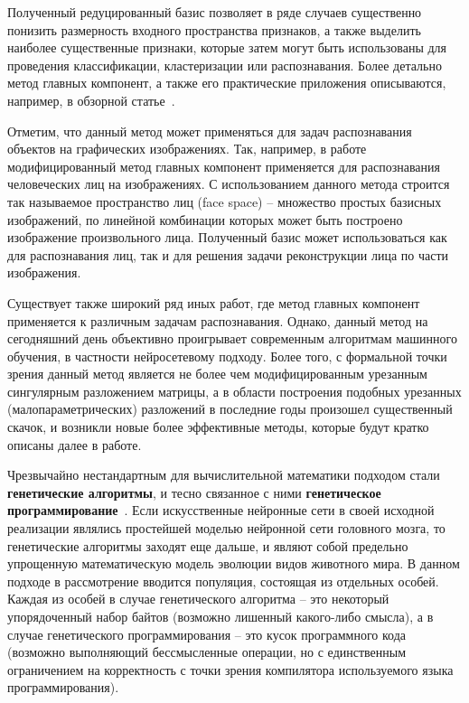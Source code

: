 \documentclass[a4paper,12pt,russian]{article} %
\begin{document}
Полученный редуцированный базис позволяет в ряде случаев существенно понизить размерность входного пространства признаков, а также выделить наиболее существенные признаки, которые затем могут быть использованы для проведения классификации, кластеризации или распознавания.
Более детально метод главных компонент, а также его практические приложения описываются, например, в обзорной статье~\cite{karamizadeh2013overview}.

Отметим, что данный метод может применяться для задач распознавания объектов на графических изображениях.
Так, например, в работе~\cite{deng2014transform} модифицированный метод главных компонент применяется для распознавания человеческих лиц на изображениях.
С использованием данного метода строится так называемое пространство лиц (face space) -- множество простых базисных изображений, по линейной комбинации которых может быть построено изображение произвольного лица.
Полученный базис может использоваться как для распознавания лиц, так и для решения задачи реконструкции лица по части изображения.

Существует также широкий ряд иных работ, где метод главных компонент применяется к различным задачам распознавания.
Однако, данный метод на сегодняшний день объективно проигрывает современным алгоритмам машинного обучения, в частности нейросетевому подходу.
Более того, с формальной точки зрения данный метод является не более чем модифицированным урезанным сингулярным разложением матрицы, а в области построения подобных урезанных (малопараметрических) разложений в последние годы произошел существенный скачок, и возникли новые более эффективные методы, которые будут кратко описаны далее в работе.

Чрезвычайно нестандартным для вычислительной математики подходом стали \textbf{генетические алгоритмы}, и тесно связанное с ними \textbf{генетическое программирование}~\cite{koza1994genetic,banzhaf1998genetic}.
Если искусственные нейронные сети в своей исходной реализации являлись простейшей моделью нейронной сети головного мозга, то генетические алгоритмы заходят еще дальше, и являют собой предельно упрощенную математическую модель эволюции видов животного мира.
В данном подходе в рассмотрение вводится популяция, состоящая из отдельных особей.
Каждая из особей в случае генетического алгоритма -- это некоторый упорядоченный набор байтов (возможно лишенный какого-либо смысла), а в случае генетического программирования -- это кусок программного кода (возможно выполняющий бессмысленные операции, но с единственным ограничением на корректность с точки зрения компилятора используемого языка программирования).
\end{document}
